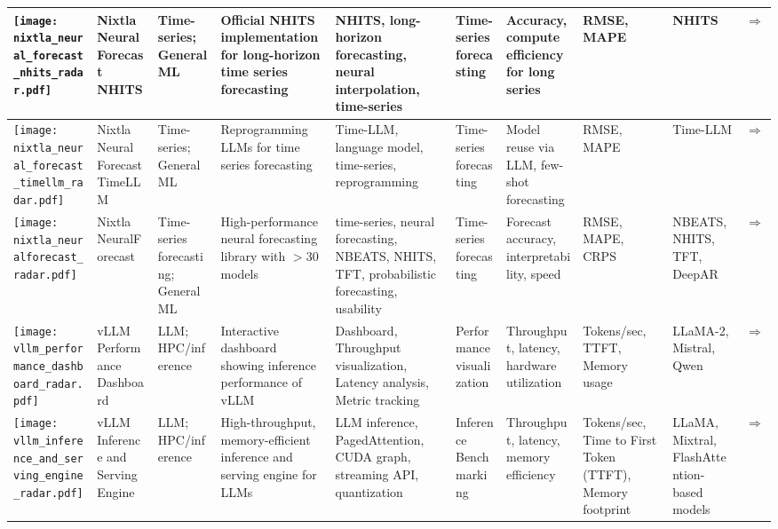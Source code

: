 \begin{landscape}
{\begin{longtable}{|p{}|p{}|p{}|p{}|p{}|p{}|p{}|p{}|p{}|p{}|}
\texttt{[image: nixtla\_neural\_forecast\_nhits\_radar.pdf]} & Nixtla Neural Forecast NHITS & Time-series; General ML & Official NHITS implementation for long-horizon time series forecasting & NHITS, long-horizon forecasting, neural interpolation, time-series & Time-series forecasting & Accuracy, compute efficiency for long series & RMSE, MAPE & NHITS & \cite{challu2023nhits}\href{https://github.com/Nixtla/neuralforecast}{$\Rightarrow$} \\ \hline
\texttt{[image: nixtla\_neural\_forecast\_timellm\_radar.pdf]} & Nixtla Neural Forecast TimeLLM & Time-series; General ML & Reprogramming LLMs for time series forecasting & Time-LLM, language model, time-series, reprogramming & Time-series forecasting & Model reuse via LLM, few-shot forecasting & RMSE, MAPE & Time-LLM & \cite{jin2024timellmtimeseriesforecasting}\href{https://github.com/Nixtla/neuralforecast}{$\Rightarrow$} \\ \hline
\texttt{[image: nixtla\_neuralforecast\_radar.pdf]} & Nixtla NeuralForecast & Time-series forecasting; General ML & High-performance neural forecasting library with \ensuremath{>}30 models & time-series, neural forecasting, NBEATS, NHITS, TFT, probabilistic forecasting, usability & Time-series forecasting & Forecast accuracy, interpretability, speed & RMSE, MAPE, CRPS & NBEATS, NHITS, TFT, DeepAR & \cite{olivares2022library_neuralforecast}\href{https://github.com/Nixtla/neuralforecast}{$\Rightarrow$} \\ \hline
\texttt{[image: vllm\_performance\_dashboard\_radar.pdf]} & vLLM Performance Dashboard & LLM; HPC/inference & Interactive dashboard showing inference performance of vLLM & Dashboard, Throughput visualization, Latency analysis, Metric tracking & Performance visualization & Throughput, latency, hardware utilization & Tokens/sec, TTFT, Memory usage & LLaMA-2, Mistral, Qwen & \cite{mo2024vllm_dashboard}\href{https://simon-mo-workspace.observablehq.cloud/vllm-dashboard-v0/}{$\Rightarrow$} \\ \hline
\texttt{[image: vllm\_inference\_and\_serving\_engine\_radar.pdf]} & vLLM Inference and Serving Engine & LLM; HPC/inference & High-throughput, memory-efficient inference and serving engine for LLMs & LLM inference, PagedAttention, CUDA graph, streaming API, quantization & Inference Benchmarking & Throughput, latency, memory efficiency & Tokens/sec, Time to First Token (TTFT), Memory footprint & LLaMA, Mixtral, FlashAttention-based models & \cite{10.1145/3600006.3613165}\href{https://github.com/vllm-project/vllm/tree/main/benchmarks}{$\Rightarrow$} \\ \hline

\end{longtable}}
\end{landscape}
